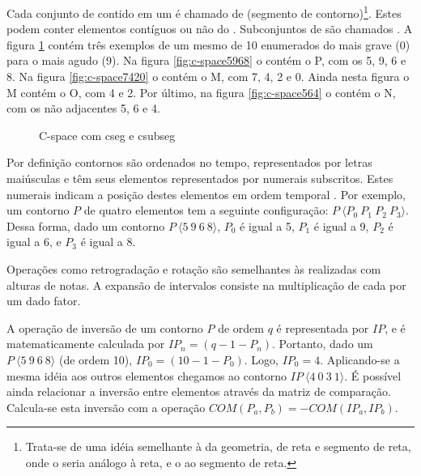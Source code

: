 Cada conjunto de  contido em um  é chamado de
 (segmento de contorno)\footnote{Trata-se de uma idéia
  semelhante à da geometria, de reta e segmento de reta, onde o
   seria análogo à reta, e o  ao segmento de
  reta.}. Estes  podem conter elementos contíguos ou não do
. Subconjuntos de  são chamados . A
figura \ref{fig:c-space} contém três exemplos de um mesmo 
de 10  enumerados do mais grave (0) para o mais agudo
(9). Na figura \ref{fig:c-space5968} o  contém o 
P, com os  5, 9, 6 e 8. Na figura \ref{fig:c-space7420} o
 contém o  M, com  7, 4, 2 e 0. Ainda
nesta figura o  M contém o  O, com  4
e 2. Por último, na figura \ref{fig:c-space564} o  contém
o  N, com os  não adjacentes 5, 6 e 4.

\begin{figure}
  \centering
  \caption{C-space com cseg e csubseg}
  \label{fig:c-space}
\end{figure}

Por definição contornos são ordenados no tempo, representados por
letras maiúsculas e têm seus elementos representados por numerais
subscritos. Estes numerais indicam a posição destes elementos em ordem
temporal \cite{marvin.ea87:relating}. Por exemplo, um contorno $P$ de
quatro elementos tem a seguinte configuração: $P\:\langle
P_0\:P_1\:P_2\:P_3\rangle$. Dessa forma, dado um contorno
$P\:\langle5\:9\:6\:8\rangle$, $P_0$ é igual a 5, $P_1$ é igual a 9,
$P_2$ é igual a 6, e $P_3$ é igual a 8.

Operações como retrogradação e rotação são semelhantes às realizadas
com alturas de notas. A expansão de intervalos 
consiste na multiplicação de cada  por um dado fator.

A operação de inversão de um contorno $P$ de ordem $q$ é representada
por $IP$, e é matematicamente calculada por
$IP_n=(q-1-P_n)$. Portanto, dado um 
$P\:\langle5\:9\:6\:8\rangle$ (de ordem 10), $IP_0=(10-1-P_0)$. Logo,
$IP_0=4$. Aplicando-se a mesma idéia aos outros elementos chegamos ao
contorno $IP\:\langle4\:0\:3\:1\rangle$. É possível ainda relacionar a
inversão entre elementos através da matriz de comparação. Calcula-se
esta inversão com a operação $COM(P_a,P_b)=-COM(IP_a,IP_b)$.

